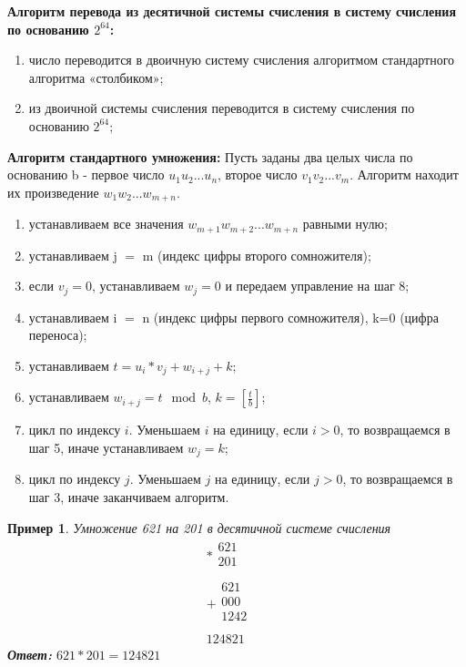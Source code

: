 \documentclass[14pt, russian]{scrartcl}
\newcounter{cExample}
\newtheorem{Example}{Пример}[cExample]
\begin{document}
\noindent
\textbf{Алгоритм перевода из десятичной системы счисления в систему счисления по основанию $2^{64}$:}
\begin{enumerate}
    \item число переводится в двоичную систему счисления алгоритмом стандартного алгоритма «столбиком»;
    \item из двоичной системы счисления переводится в систему счисления по основанию $2^{64}$;
\end{enumerate}
\noindent
\textbf{Алгоритм стандартного умножения:} Пусть заданы два целых числа по основанию b - первое число $u_{1}u_{2}...u_{n}$, второе число $v_{1}v_{2}...v_{m}$. Алгоритм находит их произведение $w_{1}w_{2}...w_{m+n}$.
\begin{enumerate}
    \item устанавливаем все значения $w_{m+1}w_{m+2}...w_{m+n}$ равными нулю;
    \item устанавливаем j $=$ m (индекс цифры второго сомножителя);
    \item если $v_{j}=0$, устанавливаем $w_{j}=0$ и передаем управление на шаг 8;
    \item устанавливаем i $=$ n (индекс цифры первого сомножителя), k=0 (цифра переноса);
    \item устанавливаем $t=u_{i}*v_{j}+w_{i+j}+k$;
    \item устанавливаем $w_{i+j}=t\mod{b}$, $k=[\frac{t}{b}]$;
    \item цикл по индексу $i$. Уменьшаем $i$ на единицу, если $i>0$, то возвращаемся в шаг 5, иначе устанавливаем $w_{j}=k$;
    \item цикл по индексу $j$. Уменьшаем $j$ на единицу, если $j>0$, то возвращаемся в шаг 3, иначе заканчиваем алгоритм.
\end{enumerate}
\begin{Example}\label{Example:MathFont5}
Умножение 621 на 201 в десятичной системе счисления
$$
\begin{array}{r}
*
\begin{array}{r}
621\\
201\\
\end{array} \\
\hline
+
\begin{array}{r}
621\\
000\,\,\,\,\\
1242\,\,\,\,\,\,\,\\
\end{array} \\
\hline
124821\,\,\,
\end{array}
$$
\textbf{Ответ:} $621*201 = 124821$ 
\end{Example}
\end{document}
